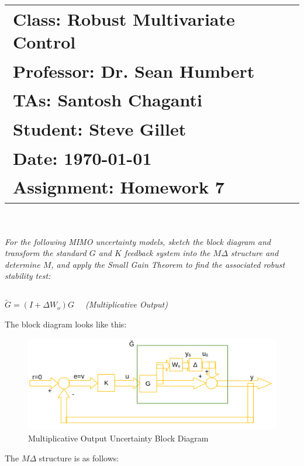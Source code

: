 \documentclass{article}
\begin{document}
\title{
    \begin{tabular}{@{}l@{}}
        \textbf{Class:} Robust Multivariate Control \\
        \textbf{Professor:} Dr. Sean Humbert \\
        \textbf{TAs:} Santosh Chaganti \\
        \textbf{Student:} Steve Gillet \\
        \textbf{Date:} \today \\
        \textbf{Assignment:} Homework 7
    \end{tabular}
}

\author{}
\date{}

\maketitle

\section{}
\textit{For the following MIMO uncertainty models, sketch the block diagram and transform the standard $G$ and $K$ feedback system into the $M \Delta$ structure and determine $M$, and apply the Small Gain Theorem to find the associated robust stability test:}

\subsection{}
\textit{$\tilde{G}=\left(I+\Delta W_o\right) G \quad$ (Multiplicative Output)}

The block diagram looks like this:

\begin{figure}[H]
    \centering
    \includegraphics[width=\textwidth]{1aDiagram.png}
    \caption{Multiplicative Output Uncertainty Block Diagram}
    \label{fig:1aDiagram}
\end{figure}

The $M \Delta$ structure is as follows:
\end{document}
